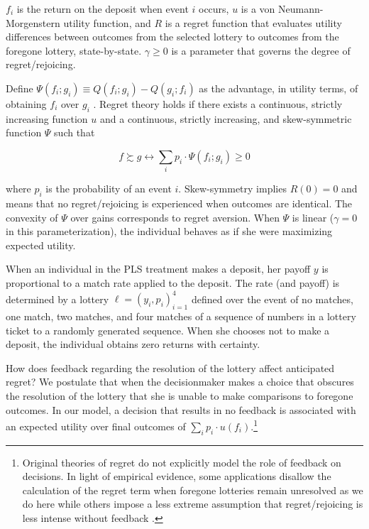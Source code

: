 \documentclass[12pt]{article}
\begin{document}
	$f_i$ is the return on the deposit when event $i$ occurs, $u$ is a von Neumann-Morgenstern utility function, and $R$ is a regret function that evaluates utility differences between outcomes from the selected lottery to outcomes from the foregone lottery, state-by-state. $\gamma \geq 0$ is a parameter that governs the degree of regret/rejoicing.

	Define $\Psi(f_i; g_i) \equiv Q(f_i; g_i) - Q(g_i; f_i)$ as the advantage, in utility terms, of obtaining $f_i$ over $g_i$ . Regret theory holds if there exists a continuous, strictly increasing function $u$ and a continuous, strictly increasing, and skew-symmetric function $\Psi$ such that

		\[ f \succsim g \leftrightarrow \sum_{i} p_{i} \cdot \Psi (f_i; g_i) \geq 0 \]

	\noindent where $p_i$ is the probability of an event $i$. Skew-symmetry implies $R(0) = 0$ and means that no regret/rejoicing is experienced when outcomes are identical. The convexity of $\Psi$ over gains corresponds to regret aversion. When $\Psi$ is linear ($\gamma = 0$ in this parameterization), the individual behaves as if she were maximizing expected utility.

	When an individual in the PLS treatment makes a deposit, her payoff $y$ is proportional to a match rate applied to the deposit. The rate (and payoff) is determined by a lottery $\ell = (y_i, p_i)_{i=1}^{4}$ defined over the event of no matches, one match, two matches, and four matches of a sequence of numbers in a lottery ticket to a randomly generated sequence. When she chooses not to make a deposit, the individual obtains zero returns with certainty.

	How does feedback regarding the resolution of the lottery affect anticipated regret? We postulate that when the decisionmaker makes a choice that obscures the resolution of the lottery that she is unable to make comparisons to foregone outcomes. In our model, a decision that results in no feedback is associated with an expected utility over final outcomes of $\sum_{i} p_{i} \cdot u(f_i)$.\footnote{Original theories of regret \parencite{loomes_regret_1982,bell_risk_1983} do not explicitly model the role of feedback on decisions. In light of empirical evidence, some applications disallow the calculation of the regret term when foregone lotteries remain unresolved as we do here \parencite{strack_too_2019,filiz-ozbay_auctions_2007} while others impose a less extreme assumption that regret/rejoicing is less intense without feedback \parencite{somasundaram_regret_2017,humphrey_feedback-conditional_2004}.}
\end{document}
